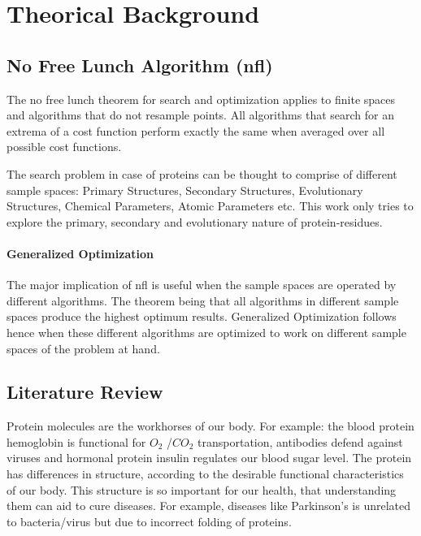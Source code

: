 \chapter{Theorical Background}


\section{No Free Lunch Algorithm (\acrshort{nfl})}
The no free lunch theorem for search and optimization \cite{Wolpert2005} applies to finite spaces and algorithms that do not resample points. All algorithms that search for an extrema of a cost function perform exactly the same when averaged over all possible cost functions.

The search problem in case of proteins can be thought to comprise of different sample spaces: Primary Structures, Secondary Structures, Evolutionary Structures, Chemical Parameters, Atomic Parameters etc. This work only tries to explore the primary, secondary and evolutionary nature of protein-residues.

\subsubsection{Generalized Optimization}
The major implication of \acrshort{nfl} is useful when the sample spaces are operated by different algorithms. The theorem being that all algorithms in different sample spaces produce the highest optimum results. Generalized Optimization follows hence when these different algorithms are optimized to work on different sample spaces of the problem at hand.


\section{Literature Review}

Protein molecules are the workhorses of our body. For example: the blood protein hemoglobin is functional for $O_2$ /$CO_2$ transportation, antibodies defend against viruses and hormonal protein insulin regulates our blood sugar level. The protein has differences in structure, according to the desirable functional characteristics of our body. This structure is so important for our health, that understanding them can aid to cure diseases. For example, diseases like Parkinson’s is unrelated to bacteria/virus but due to incorrect folding of proteins. 
\iffalse So, modeling of protein structures is vital to interpret disease mechanisms and design new drug treatments. Modeling of protein requires protein contact prediction after which 3D models are generated using suitable software packages like CONFOLD suite. \fi

